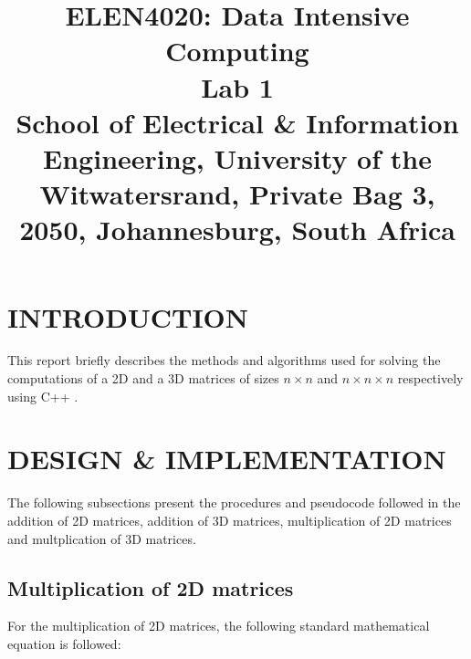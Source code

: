\documentclass[conference]{IEEEtran}
\begin{document}
\title{ELEN4020: Data Intensive Computing\\ Lab 1\\
{\footnotesize School of Electrical \& Information Engineering, University of the
Witwatersrand, Private Bag 3, 2050, Johannesburg, South Africa}
}


\author{

\and
{}
\and
{}

}

\maketitle


\section{INTRODUCTION}
This report briefly describes the methods and algorithms used for solving the computations of a 2D and a 3D matrices of sizes $ n\times n $ and $n\times n\times n$ respectively using C++ .



%
\section{DESIGN \& IMPLEMENTATION}
The following subsections present the procedures and pseudocode followed in the addition of 2D matrices, addition of 3D matrices, multiplication of 2D matrices and multplication of 3D matrices.

\subsection{Multiplication of 2D matrices}
For the multiplication of 2D matrices, the following standard mathematical equation is followed:
\end{document}
